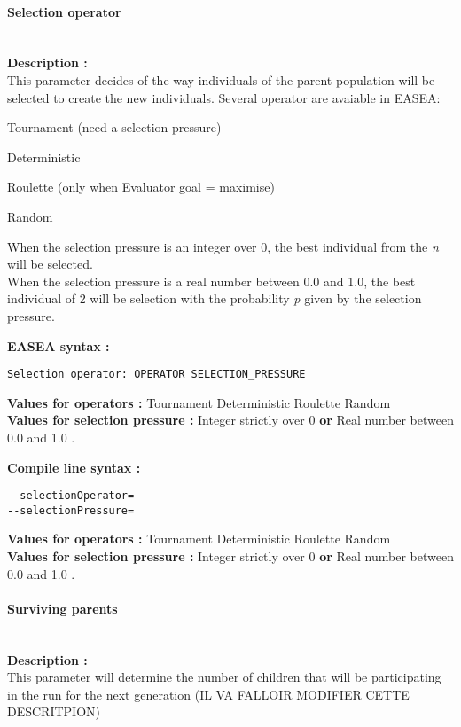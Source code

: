 \documentclass{book}
\begin{document}
\paragraph{Selection operator}\label{selection-operator}
~\\

\textbf{Description :}\\This parameter decides of the way individuals of
the parent population will be selected to create the new individuals.
Several operator are avaiable in EASEA:

Tournament (need a selection pressure)

Deterministic

Roulette (only when Evaluator goal = maximise)

Random

When the selection pressure is an integer over 0, the best individual
from the \emph{n} will be selected.\\When the selection pressure is a
real number between 0.0 and 1.0, the best individual of 2 will be
selection with the probability \emph{p} given by the selection pressure.

\textbf{EASEA syntax :}

\texttt{Selection~operator:~OPERATOR~SELECTION\_PRESSURE}

\textbf{Values for operators :} Tournament Deterministic Roulette
Random\\\textbf{Values for selection pressure :} Integer strictly over 0
\textbf{or} Real number between 0.0 and 1.0 .

\textbf{Compile line syntax :}

\texttt{-{}-selectionOperator=}\\\texttt{-{}-selectionPressure=}

\textbf{Values for operators :} Tournament Deterministic Roulette
Random\\\textbf{Values for selection pressure :} Integer strictly over 0
\textbf{or} Real number between 0.0 and 1.0 .

\paragraph{Surviving parents}\label{surviving-parents}
~\\

\textbf{Description :}\\This parameter will determine the number of
children that will be participating in the run for the next generation
(IL VA FALLOIR MODIFIER CETTE DESCRITPION)
\end{document}
